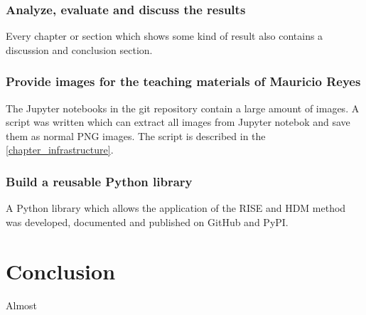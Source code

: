 \subsubsection{Analyze, evaluate and discuss the results}
Every chapter or section which shows some kind of result also contains a discussion and conclusion section.

\subsubsection{Provide images for the teaching materials of Mauricio Reyes}
The Jupyter notebooks in the git repository contain a large amount of images. A script was written which can extract all images from Jupyter notebok and save them as normal PNG images. The script is described in the \autoref{chapter_infrastructure}.

\subsubsection{Build a reusable Python library}
A Python library which allows the application of the RISE and HDM method was developed, documented and published on GitHub and PyPI.

\section{Conclusion}
Almost 